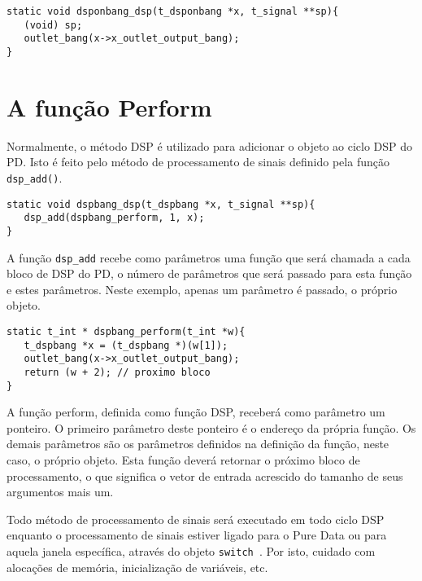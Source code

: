 \begin{lstlisting}[caption=O método DSP]
static void dsponbang_dsp(t_dsponbang *x, t_signal **sp){
   (void) sp;
   outlet_bang(x->x_outlet_output_bang);
}
\end{lstlisting}

\section{A função Perform}

Normalmente, o método DSP é utilizado para adicionar o objeto ao ciclo DSP do PD.
Isto é feito pelo método de processamento de sinais definido pela função \texttt{dsp\_add()}.

\begin{lstlisting}[caption=O método DSP add]
static void dspbang_dsp(t_dspbang *x, t_signal **sp){
   dsp_add(dspbang_perform, 1, x);
}
\end{lstlisting}

A função \texttt{dsp\_add} recebe como parâmetros uma função que será chamada a
cada bloco de DSP do PD, o número de parâmetros que será passado para esta função
e estes parâmetros.
Neste exemplo, apenas um parâmetro é passado, o próprio objeto.

\begin{lstlisting}[caption=A função perform]
static t_int * dspbang_perform(t_int *w){
   t_dspbang *x = (t_dspbang *)(w[1]);
   outlet_bang(x->x_outlet_output_bang);
   return (w + 2); // proximo bloco
}
\end{lstlisting}

A função perform, definida como função DSP, receberá como parâmetro um ponteiro.
O primeiro parâmetro deste ponteiro é o endereço da própria função.
Os demais parâmetros são os parâmetros definidos na definição da função, neste
caso, o próprio objeto.
Esta função deverá retornar o próximo bloco de processamento, o que significa
o vetor de entrada acrescido do tamanho de seus argumentos mais um.

Todo método de processamento de sinais será executado em todo ciclo DSP enquanto
o processamento de sinais estiver ligado para o Pure Data ou para aquela janela
específica, através do objeto \texttt{switch~}.
Por isto, cuidado com alocações de memória, inicialização de variáveis, etc.

